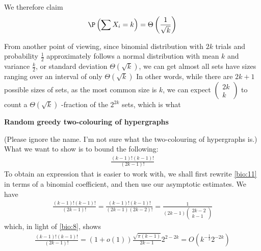 \documentclass{article}
\begin{document}
We therefore claim 
\begin{align}
    \P\left(\sum X_i=k\right)=\Theta \left(\frac{1}{\sqrt{k}}\right) \label{bio:11}
\end{align}

From another point of viewing, since binomial distribution with $2 k$ trials and probability $\frac{1}{2}$ approximately follows a normal distribution with mean $k$ and variance $\frac{k}{2}$, or standard deviation $\Theta(\sqrt{k})$, we can get almost all sets have sizes ranging over an interval of only $\Theta \left(\sqrt{k}\right)$ 
In other words, while there are $2k+1$ possible sizes of sets, as the most common size is $k$, we can expect $\left(\begin{array}{c}2 k \\ k\end{array}\right)$ to count a $\Theta(\sqrt{k})$ -fraction of the $2^{2 k}$ sets, which is what

\textbf{Random greedy two-colouring of hypergraphs} 

(Please ignore the name. I'm not sure what  the two-colouring of hypergraphs is.) What we want to show is to bound the following:
\begin{align}
\frac{(k-1) !(k-1) !}{(2 k-1) !} \label{bio:11}
\end{align}
To obtain an expression that is easier to work with, we shall first rewrite \cref{bio:11} in terms of a binomial coefficient, and then use our asymptotic estimates. We have
\begin{align*}
\frac{(k-1) !(k-1) !}{(2 k-1) !}=\frac{(k-1) !(k-1) !}{(2 k-1)(2 k-2) !}=\frac{1}{(2 k-1)\left(\begin{array}{c}
2 k-2 \\
k-1
\end{array}\right)}
\end{align*}
which, in light of \cref{bio:8}, shows
\begin{align*}
\frac{(k-1) !(k-1) !}{(2 k-1) !}=(1+o(1)) \frac{\sqrt{\pi(k-1)}}{2 k-1} 2^{2-2 k}=O\left(k^{-\frac{1}{2}} 2^{-2 k}\right)
\end{align*}
\end{document}
